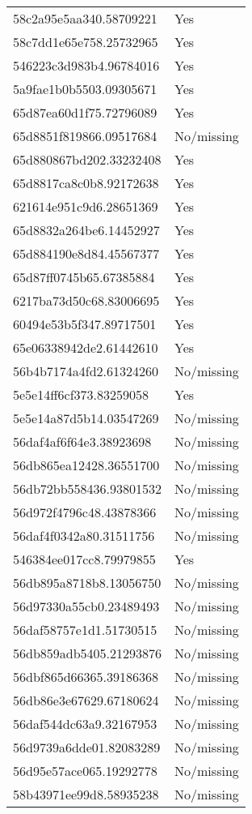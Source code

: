 \begin{tabular}{ll}
58c2a95e5aa340.58709221 & Yes \\
58c7dd1e65e758.25732965 & Yes \\
546223c3d983b4.96784016 & Yes \\
5a9fae1b0b5503.09305671 & Yes \\
65d87ea60d1f75.72796089 & Yes \\
65d8851f819866.09517684 & No/missing \\
65d880867bd202.33232408 & Yes \\
65d8817ca8c0b8.92172638 & Yes \\
621614e951c9d6.28651369 & Yes \\
65d8832a264be6.14452927 & Yes \\
65d884190e8d84.45567377 & Yes \\
65d87ff0745b65.67385884 & Yes \\
6217ba73d50c68.83006695 & Yes \\
60494e53b5f347.89717501 & Yes \\
65e06338942de2.61442610 & Yes \\
56b4b7174a4fd2.61324260 & No/missing \\
5e5e14ff6cf373.83259058 & Yes \\
5e5e14a87d5b14.03547269 & No/missing \\
56daf4af6f64e3.38923698 & No/missing \\
56db865ea12428.36551700 & No/missing \\
56db72bb558436.93801532 & No/missing \\
56d972f4796c48.43878366 & No/missing \\
56daf4f0342a80.31511756 & No/missing \\
546384ee017cc8.79979855 & Yes \\
56db895a8718b8.13056750 & No/missing \\
56d97330a55cb0.23489493 & No/missing \\
56daf58757e1d1.51730515 & No/missing \\
56db859adb5405.21293876 & No/missing \\
56dbf865d66365.39186368 & No/missing \\
56db86e3e67629.67180624 & No/missing \\
56daf544dc63a9.32167953 & No/missing \\
56d9739a6dde01.82083289 & No/missing \\
56d95e57ace065.19292778 & No/missing \\
58b43971ee99d8.58935238 & No/missing \\

\end{tabular}
